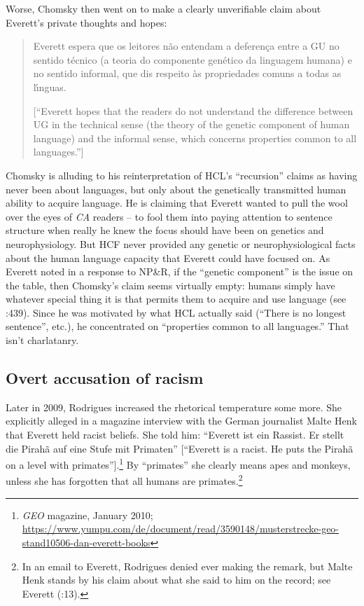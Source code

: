 \documentclass[output=paper,colorlinks,citecolor=brown
]{langscibook}
\begin{document}
Worse, Chomsky then went on to make a clearly unverifiable claim about
Everett's private thoughts and hopes:
\begin{quote}
Everett espera que os leitores n{\~a}o entendam a deferença entre a GU no
sentido t{\'e}cnico (a teoria do componente gen{\'e}tico da linguagem
humana) e no sentido informal, que dis respeito {\`a}s propriedades comuns
a todas as l{\'\i}nguas.

[``Everett hopes that the readers do not understand the difference between
UG in the technical sense (the theory of the genetic component of human
language) and the informal sense, which concerns properties common to all
languages.'']
\end{quote}
Chomsky is alluding to his reinterpretation of HCL's ``recursion'' claims
as having never been about languages, but only about the genetically
transmitted human ability to acquire language. He is claiming that
Everett wanted to pull the wool over the eyes of \textit{CA} readers
-- to fool them into paying attention to sentence structure when
really he knew the focus should have been on genetics and neurophysiology.
But HCF never provided any genetic or neurophysiological facts about the
human language capacity that Everett could have focused on. As Everett
noted in a response to NP\&R, if the ``genetic component'' is the issue
on the table, then Chomsky's claim seems virtually empty: humans simply
have whatever special thing it is that permits them to acquire and use
language (see \citealt{Everett09}:439). Since he was motivated by what
HCL actually said (``There is no longest sentence'', etc.), he concentrated
on ``properties common to all languages.'' That isn't charlatanry.

\subsection{Overt accusation of racism}

Later in 2009, Rodrigues increased the rhetorical temperature some
more. She explicitly alleged in a magazine interview with the German
journalist Malte Henk that Everett held racist beliefs. She told him:
``Everett ist ein Rassist.  Er stellt die Pirah{\~a} auf eine Stufe mit
Primaten'' [``Everett is a racist. He puts the Pirah{\~a} on a level
with primates''].\footnote{%
   \textit{GEO} magazine, January 2010;
   \url{https://www.yumpu.com/de/document/read/3590148/musterstrecke-geo-stand10506-dan-everett-books}}
By ``primates'' she clearly means apes and monkeys, unless she has
forgotten that all humans are primates.\footnote{%
   In an email to Everett, Rodrigues denied ever making the remark,
   but Malte Henk stands by his claim about what she said to him on the
   record; see Everett (\citeyear{Everett13}:13).}
\end{document}
